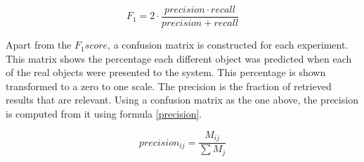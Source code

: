 		
		\begin{center}
		\begin{equation}
		F_1=2\cdot\frac{precision \cdot recall}{precision + recall}
		\label{f1}
		\end{equation}
		\end{center}

		Apart from the $F_1 score$, a confusion matrix is constructed for each experiment. 
		This matrix shows the percentage each different object was predicted when each of the real objects were presented to the system. 
		This percentage is shown transformed to a zero to one scale. 
		The precision is the fraction of retrieved results that are relevant.  
		Using a confusion matrix as the one above, the precision is computed from it using formula \ref{precision}.
		\begin{center}
		\begin{equation}
		\label{precision}
		precision_{ij}=\frac{M_{ij}}{\sum M_j}
		\end{equation}
		\end{center}

